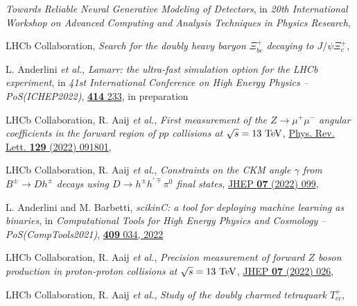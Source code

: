 \begin{cvcontent}
\begin{enumerate}[label={[\arabic*]}, leftmargin=1.5cm]
    \emph{Towards Reliable Neural Generative Modeling of Detectors},
    in \emph{20th International Workshop on Advanced Computing and Analysis Techniques in Physics Research},
    \sloppy
    \item LHCb Collaboration,
    \emph{Search for the doubly heavy baryon $\Xi_{bc}^{+}$ decaying to $J/\psi \Xi_{c}^{+}$},
  \end{enumerate}
  \vspace{3mm}
  \begin{enumerate}[label={[\arabic*]}, leftmargin=1.5cm]
    \item L. Anderlini \emph{et al.},
    \emph{Lamarr: the ultra-fast simulation option for the LHCb experiment},
    in \emph{41st International Conference on High Energy Physics -- PoS(ICHEP2022)},
    \href{https://doi.org/10.22323/1.414.0233}{\textbf{414} 233}, in preparation
    \item LHCb Collaboration, R. Aaij \emph{et al.},
    \emph{First measurement of the $Z\rightarrow \mu^+ \mu^-$ angular coefficients in the forward region of $pp$ collisions at $\sqrt{s}=13~\rm{TeV}$},
    \href{https://link.aps.org/doi/10.1103/PhysRevLett.129.091801}{Phys. Rev. Lett. \textbf{129} (2022) 091801},
    \item LHCb Collaboration, R. Aaij \emph{et al.}, 
    \emph{Constraints on the CKM angle $\gamma$ from $B^\pm \rightarrow Dh^\pm$ decays using $D \rightarrow h^\pm h^{\prime\mp}\pi^0$ final states},
    \href{https://doi.org/10.1007/JHEP07(2022)099}{JHEP \textbf{07} (2022) 099},
    \item L. Anderlini and M. Barbetti, 
    \emph{scikinC: a tool for deploying machine learning as binaries}, 
    in \emph{Computational Tools for High Energy Physics and Cosmology -- PoS(CompTools2021)}, 
    \href{https://doi.org/10.22323/1.409.0034}{\textbf{409} 034, 2022}
    \item LHCb Collaboration, R. Aaij \emph{et al.}, 
    \emph{Precision measurement of forward $Z$ boson production in proton-proton collisions at $\sqrt{s} = 13~\rm{TeV}$},
    \href{https://doi.org/10.1007/JHEP07(2022)026}{JHEP \textbf{07} (2022) 026},
    \item LHCb Collaboration, R. Aaij \emph{et al.}, 
    \emph{Study of the doubly charmed tetraquark $T_{cc}^+$},

\end{enumerate}
\end{cvcontent}
